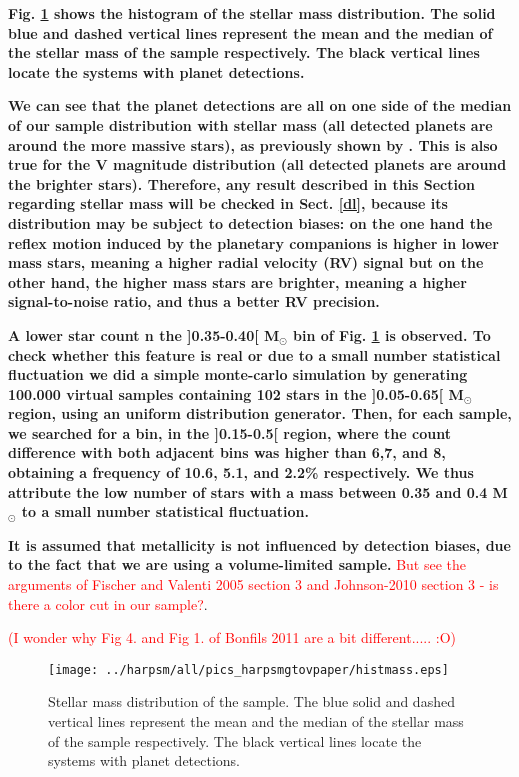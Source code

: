 \documentclass[structabstract]{aa}
\begin{document}

\textbf{Fig. \ref{histmass} shows the histogram of the stellar mass distribution. The solid blue and dashed vertical lines represent the mean and the median of the stellar mass of the sample respectively. The black vertical lines locate the systems with planet detections. }

\textbf{We can see that the planet detections are all on one side of the median of our sample distribution with stellar mass (all detected planets are around the more massive stars), as previously shown by \cite{Bonfils-2011}. This is also true for the V magnitude distribution (all detected planets are around the brighter stars). Therefore, any result described in this Section regarding stellar mass will be checked in Sect. \ref{dl}, because its distribution may be subject to detection biases: on the one hand the reflex motion induced by the planetary companions is higher in lower mass stars, meaning a higher radial velocity (RV) signal but on the other hand, the higher mass stars are brighter, meaning a higher signal-to-noise ratio, and thus a better RV precision.}

\textbf{A lower star count n the ]0.35-0.40[ M$_{\odot}$ bin of Fig. \ref{histmass} is observed. To check whether this feature is real or due to a small number statistical fluctuation we did a simple monte-carlo simulation by generating 100.000 virtual samples containing 102 stars in the ]0.05-0.65[  M$_{\odot}$  region, using an uniform distribution generator. Then, for each sample, we searched for a bin, in the ]0.15-0.5[ region, where the count difference with both adjacent bins was higher than 6,7, and 8, obtaining a frequency of 10.6, 5.1, and 2.2\% respectively. We thus attribute the low number of stars with a mass between 0.35 and 0.4 M$_{\odot}$ to a small number statistical fluctuation.} 

\textbf{It is assumed that metallicity is not influenced by detection biases, due to the fact that we are using a volume-limited sample.} \textcolor{red}{But see the arguments of Fischer and Valenti 2005 section 3 and Johnson-2010 section 3 - is there a color cut in our sample?}. 


\textcolor{red}{(I wonder why Fig 4. and Fig 1. of Bonfils 2011 are a bit different..... :O)}

\begin{figure}[h]
\begin{center}
\texttt{[image: ../harpsm/all/pics\_harpsmgtovpaper/histmass.eps]}
\end{center}
\caption{Stellar mass distribution of the sample. The blue solid and dashed vertical lines represent the mean and the median of the stellar mass of the sample respectively. The black vertical lines locate the systems with planet detections.}
\label{histmass}
\end{figure}
\end{document}
